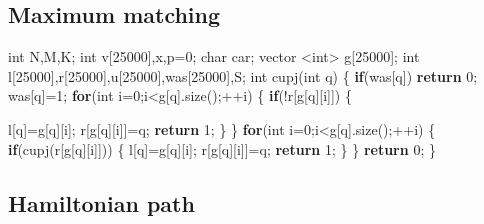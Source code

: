 \documentclass[10pt,]{article}
\newenvironment{Shaded}{}{}
\newcommand{\KeywordTok}[1]{\textcolor[rgb]{0.00,0.44,0.13}{\textbf{{#1}}}}
\newcommand{\DataTypeTok}[1]{\textcolor[rgb]{0.56,0.13,0.00}{{#1}}}
\newcommand{\DecValTok}[1]{\textcolor[rgb]{0.25,0.63,0.44}{{#1}}}
\newcommand{\NormalTok}[1]{{#1}}
\begin{document}
\subsection{Maximum matching}

\begin{Shaded}
\begin{Highlighting}[]
\DataTypeTok{int} \NormalTok{N,M,K;}
\DataTypeTok{int} \NormalTok{v[}\DecValTok{25000}\NormalTok{],x,p=}\DecValTok{0}\NormalTok{;}
\DataTypeTok{char} \NormalTok{car;}
\NormalTok{vector <}\DataTypeTok{int}\NormalTok{> g[}\DecValTok{25000}\NormalTok{];}
\DataTypeTok{int} \NormalTok{l[}\DecValTok{25000}\NormalTok{],r[}\DecValTok{25000}\NormalTok{],u[}\DecValTok{25000}\NormalTok{],was[}\DecValTok{25000}\NormalTok{],S;}
\DataTypeTok{int} \NormalTok{cupj(}\DataTypeTok{int} \NormalTok{q)}
\NormalTok{\{}
  \KeywordTok{if}\NormalTok{(was[q])}
    \KeywordTok{return} \DecValTok{0}\NormalTok{;}
  \NormalTok{was[q]=}\DecValTok{1}\NormalTok{;}
  \KeywordTok{for}\NormalTok{(}\DataTypeTok{int} \NormalTok{i=}\DecValTok{0}\NormalTok{;i<g[q].size();++i)}
  \NormalTok{\{}
    \KeywordTok{if}\NormalTok{(!r[g[q][i]])}
    \NormalTok{\{}

      \NormalTok{l[q]=g[q][i];}
      \NormalTok{r[g[q][i]]=q;}
      \KeywordTok{return} \DecValTok{1}\NormalTok{;}
    \NormalTok{\}}
  \NormalTok{\}}
  \KeywordTok{for}\NormalTok{(}\DataTypeTok{int} \NormalTok{i=}\DecValTok{0}\NormalTok{;i<g[q].size();++i)}
  \NormalTok{\{}
    \KeywordTok{if}\NormalTok{(cupj(r[g[q][i]]))}
    \NormalTok{\{}
      \NormalTok{l[q]=g[q][i];}
      \NormalTok{r[g[q][i]]=q;}
      \KeywordTok{return} \DecValTok{1}\NormalTok{;}
    \NormalTok{\}}
  \NormalTok{\}}
  \KeywordTok{return} \DecValTok{0}\NormalTok{;}
\NormalTok{\}}
\end{Highlighting}
\end{Shaded}

\subsection{Hamiltonian path}
\end{document}
